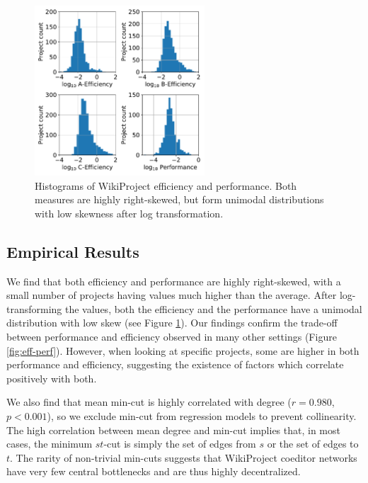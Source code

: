 \documentclass[letterpaper,twocolumn,10pt]{article}
\newcommand{\+}{\phantom{-}}
\begin{document}
\begin{figure}[t!]
\centering
\includegraphics[width=2.5in,height=2.5in]{fig-eff-perf-hist.pdf}
\caption{
Histograms of WikiProject efficiency and performance.
Both measures are highly right-skewed, but form unimodal distributions
with low skewness after log transformation.
\label{fig:eff-perf-hist}
}
\end{figure}

\subsection{Empirical Results}

We find that both efficiency and performance are highly right-skewed,
with a small number of projects having values much higher than the average.
After log-transforming the values, both the efficiency and the performance have
a unimodal distribution with low skew (see Figure \ref{fig:eff-perf-hist}).
Our findings confirm the trade-off between performance and efficiency
observed in many other settings (Figure \ref{fig:eff-perf}).
However, when looking at specific projects, some are higher in both performance
and efficiency,
suggesting the existence of factors which correlate positively with both.

We also find that mean min-cut is highly correlated with degree ($r=0.980$, $p<0.001$),
so we exclude min-cut from regression models to prevent collinearity.
The high correlation between mean degree and min-cut implies that,
in most cases,
the minimum $st$-cut is simply the set of edges from $s$
or the set of edges to $t$.
The rarity of non-trivial min-cuts suggests that WikiProject coeditor
networks have very few central
bottlenecks and are thus highly decentralized.
\end{document}
